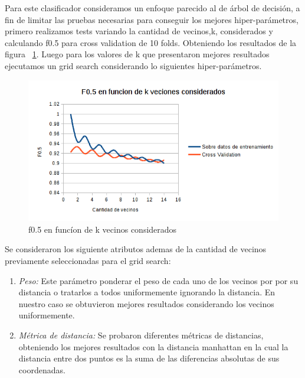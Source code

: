 Para este clasificador consideramos un enfoque parecido al de árbol de decisión, a fin de limitar las pruebas necesarias para conseguir los mejores hiper-parámetros, primero realizamos tests variando la cantidad de vecinos,k, considerados y calculando f0.5 para cross validation de 10 folds. Obteniendo los resultados de la figura ~\ref{fig:knn_f05_en_funcion_vecinos}.
Luego para los valores de k que presentaron mejores resultados ejecutamos un grid search considerando lo siguientes hiper-parámetros. 
\begin{figure}[H]
    \centering
        \includegraphics[width=\textwidth]{plots/knn_f05_en_funcion_vecinos.png}
        \caption{f0.5 en funcíon de k vecinos considerados}
        \label{fig:knn_f05_en_funcion_vecinos}
\end{figure}
    Se consideraron los siguiente atributos ademas de la cantidad de vecinos previamente seleccionadas para el grid search:
 \begin{enumerate}
\item \textit{Peso:} Este parámetro ponderar el peso de cada uno de los vecinos por por su distancia o tratarlos a todos uniformemente ignorando la distancia. En nuestro caso se obtuvieron mejores resultados considerando los vecinos uniformemente.  
\item \textit{Métrica de distancia:} Se probaron diferentes métricas de distancias, obteniendo los mejores resultados con la distancia manhattan en la cual la distancia entre dos puntos es la suma de las diferencias absolutas de sus coordenadas.
\end{enumerate}
